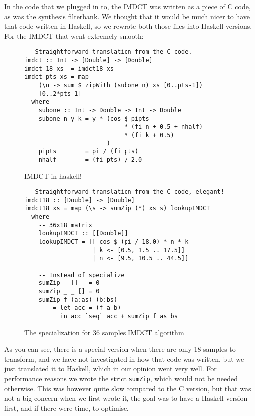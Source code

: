 \documentclass[a4paper,12pt]{article}
\begin{document}
        In the code that we plugged in to, the IMDCT was written as a piece of C
        code, as was the synthesis filterbank. We thought that it would be much
        nicer to have that code written in Haskell, so we rewrote both those
        files into Haskell versions. For the IMDCT that went extremely
        smooth:
\begin{figure}[H]
  \begin{center}
        \begin{lstlisting}
-- Straightforward translation from the C code.
imdct :: Int -> [Double] -> [Double]
imdct 18 xs  = imdct18 xs
imdct pts xs = map
    (\n -> sum $ zipWith (subone n) xs [0..pts-1])
    [0..2*pts-1]
  where
    subone :: Int -> Double -> Int -> Double
    subone n y k = y * (cos $ pipts
                            * (fi n + 0.5 + nhalf)
                            * (fi k + 0.5)
                       )
    pipts        = pi / (fi pts)
    nhalf        = (fi pts) / 2.0
        \end{lstlisting}
    \caption{IMDCT in haskell!}\label{fig:imdcthaskell}
  \end{center}
\end{figure}

\begin{figure}[H]
  \begin{center}
        \begin{lstlisting}
-- Straightforward translation from the C code, elegant!
imdct18 :: [Double] -> [Double]
imdct18 xs = map (\s -> sumZip (*) xs s) lookupIMDCT
  where
    -- 36x18 matrix
    lookupIMDCT :: [[Double]]
    lookupIMDCT = [[ cos $ (pi / 18.0) * n * k
                   | k <- [0.5, 1.5 .. 17.5]]
                   | n <- [9.5, 10.5 .. 44.5]]

    -- Instead of specialize
    sumZip _ [] _ = 0
    sumZip _ _ [] = 0
    sumZip f (a:as) (b:bs)
        = let acc = (f a b)
          in acc `seq` acc + sumZip f as bs
        \end{lstlisting}
    \caption{The specialization for 36 samples IMDCT algorithm}\label{fig:imdctimpl36}
  \end{center}
\end{figure}

        As you can see, there is a special version when there are only 18
        samples to transform, and we have not investigated in how that code was
        written, but we just translated it to Haskell, which in our opinion went
        very well. For performance reasons we wrote the strict \texttt{sumZip}, which would
        not be needed otherwise. This was however quite slow compared to the C
        version, but that was not a big concern when we first wrote it, the goal
        was to have a Haskell version first, and if there were time, to
        optimise. \\
\end{document}
